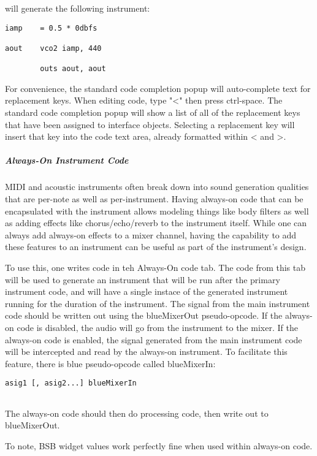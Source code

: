will generate the following instrument:

\begin{verbatim}
iamp    = 0.5 * 0dbfs

aout    vco2 iamp, 440

        outs aout, aout
\end{verbatim}

For convenience, the standard code completion popup will auto-complete
text for replacement keys. When editing code, type "\textless{}" then
press ctrl-space. The standard code completion popup will show a list of
all of the replacement keys that have been assigned to interface
objects. Selecting a replacement key will insert that key into the code
text area, already formatted within \textless{} and \textgreater{}.

\subparagraph{Always-On Instrument Code}

MIDI and acoustic instruments often break down into sound generation
qualities that are per-note as well as per-instrument. Having always-on
code that can be encapsulated with the instrument allows modeling things
like body filters as well as adding effects like chorus/echo/reverb to
the instrument itself. While one can always add always-on effects to a
mixer channel, having the capability to add these features to an
instrument can be useful as part of the instrument's design.

To use this, one writes code in teh Always-On code tab. The code from
this tab will be used to generate an instrument that will be run after
the primary instrument code, and will have a single instace of the
generated instrument running for the duration of the instrument. The
signal from the main instrument code should be written out using the
blueMixerOut pseudo-opcode. If the always-on code is disabled, the audio
will go from the instrument to the mixer. If the always-on code is
enabled, the signal generated from the main instrument code will be
intercepted and read by the always-on instrument. To facilitate this
feature, there is blue pseudo-opcode called blueMixerIn:

\begin{verbatim}
asig1 [, asig2...] blueMixerIn        
      
\end{verbatim}

The always-on code should then do processing code, then write out to
blueMixerOut.

To note, BSB widget values work perfectly fine when used within
always-on code.


